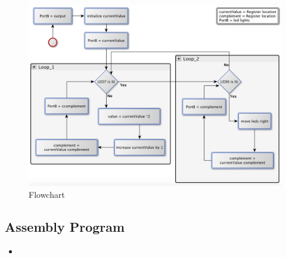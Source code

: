 \documentclass[a4paper, 12pt]{article}
\newcommand{\avrasm}[2]{
\begin{itemize}
\item[]
\end{itemize}
}
\begin{document}
\begin{figure}[h!]
\includegraphics[scale=0.5]{Flowchart_pics/assignment6_pic.png} 
\caption{Flowchart}
\label{}
\end{figure}



\clearpage

\subsection{Assembly Program}
\avrasm{../src/a6.asm}{}
\end{document}
